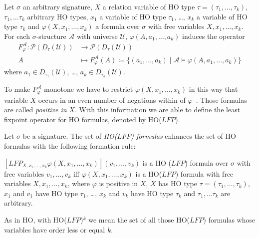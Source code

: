 \begin{definition}
    Let $\sigma$ an arbitrary signature, $X$ a relation variable of HO type $\tau = (\tau_1, \dots, \tau_k)$,
    $\tau_1, \dots \tau_k$ arbitrary HO types, $x_1$ a variable of HO type $\tau_1$, \dots, $x_k$ a
    variable of HO type $\tau_k$ and $\varphi(X, x_1, \dots, x_k)$ a formula over $\sigma$ with free variables $X, x_1,
    \dots, x_k$. For each $\sigma$-structure $\mathcal{A}$ with universe $\mathcal{U}$, $\varphi(A, a_1, \dots, a_k)$
    induces the operator
    \begin{align*}
        F_\varphi^\mathcal{A}\colon\mathscr{P}(D_\tau(\mathcal{U})) &\longrightarrow \mathscr{P}(D_\tau(\mathcal{U}))\\
        A &\longmapsto F_\varphi^\mathcal{A}(A) \coloneqq \{(a_1, \dots, a_k) \mid \mathcal{A} \models \varphi(A, a_1,
        \dots, a_k)\}
    \end{align*}
    where $a_1 \in D_{\tau_1}(\mathcal{U})$, \dots, $a_k \in D_{\tau_k}(\mathcal{U})$.
\end{definition}

To make $F_\varphi^\mathcal{A}$ monotone we have to restrict $\varphi(X, x_1, \dots, x_k)$ in this way that variable
$X$ occurs in an even number of negations within of $\varphi$~\cite{freireMartins2011descriptive}. Those formulas
are called \textit{positive in} $X$. With this information we are able to define the least fixpoint operator for HO
formulas, denoted by HO($\mathit{LFP}$).

\begin{definition}
    Let $\sigma$ be a signature. The set of \emph{HO($\mathit{LFP}$) formulas} enhances the set of HO formulas with the
    following formation rule:
    \begin{compactitem}
        \item $[\mathit{LFP}_{X, x_1, \dots, x_k}\varphi(X, x_1, \dots, x_k)](v_1, \dots, v_k)$ is a HO
        ($\mathit{LFP}$) formula over $\sigma$ with free variables $v_1, \dots, v_k$ iff $\varphi(X, x_1, \dots, x_k)
        $ is a HO($\mathit{LFP}$) formula with free variables $X, x_1, \dots, x_k$, where $\varphi$ is positive in
        $X$, $X$ has HO type $\tau = (\tau_1, \dots, \tau_k)$, $x_1$ and $v_1$ have HO type $\tau_1$, \dots, $x_k$
        and $v_k$ have HO type $\tau_k$ and $\tau_1, \dots \tau_k$ are arbitrary.
    \end{compactitem}
\end{definition}

As in HO, with HO($\mathit{LFP}$)$^k$ we mean the set of all those HO($\mathit{LFP}$) formulas whose variables have
order less or equal $k$.

